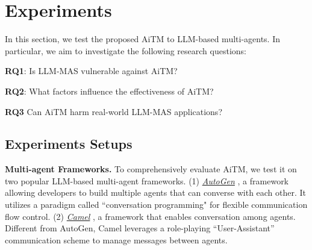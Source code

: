 \section{Experiments}

In this section, we test the proposed AiTM to LLM-based multi-agents. In particular, we aim to investigate the following research questions:

\noindent\textbf{RQ1}: Is LLM-MAS vulnerable against AiTM?

\noindent\textbf{RQ2}: What factors influence the effectiveness of AiTM?

\noindent\textbf{RQ3} Can AiTM harm real-world LLM-MAS applications?







\subsection{Experiments Setups}\label{sec:setup}


\noindent\textbf{Multi-agent Frameworks.} 
To comprehensively evaluate AiTM, we test it on two popular LLM-based multi-agent frameworks. (1) \underline{\textit{AutoGen}} \citep{wu2023autogen}, a framework allowing developers to build multiple agents that can converse with each other. It utilizes a paradigm called ``conversation programming" for flexible communication flow control. (2) \underline{\textit{Camel}} \citep{li2023camel}, a framework that enables conversation among agents. Different from AutoGen, Camel leverages a role-playing ``User-Assistant'' communication scheme to manage messages between agents. 

